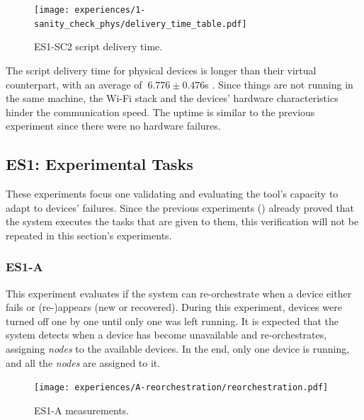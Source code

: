 \begin{figure}[h]
\centering
\texttt{[image: experiences/1-sanity\_check\_phys/delivery\_time\_table.pdf]}
\caption[ES1-SC2 script delivery time.]{ES1-SC2 script delivery time.}\label{fig:sanity_check_phys_delivery_time}
\end{figure}

The script delivery time for physical devices is longer than their virtual counterpart, with an average of $~6.776\pm0.476$s . Since things are not running in the same machine, the Wi-Fi stack and the devices' hardware characteristics hinder the communication speed. The uptime is similar to the previous experiment since there were no hardware failures.


\subsection{ES1: Experimental Tasks}\label{sec:discussion_scenario1_exp}

These experiments focus one validating and evaluating the tool's capacity to adapt to devices' failures. Since the previous experiments (\cf {}) already proved that the system executes the tasks that are given to them, this verification will not be repeated in this section's experiments.


\subsubsection{ES1-A}\label{sec:exp_a}

This experiment evaluates if the system can re-orchestrate when a device either fails or (re-)appears (\ie new or recovered). During this experiment, devices were turned off one by one until only one was left running. It is expected that the system detects when a device has become unavailable and re-orchestrates, assigning \textit{nodes} to the available devices. In the end, only one device is running, and all the \textit{nodes} are assigned to it.

\begin{figure}[h]
\centering
\texttt{[image: experiences/A-reorchestration/reorchestration.pdf]}
\caption[ES1-A measurements]{ES1-A measurements.}\label{fig:experiment_a_graph}
\end{figure}

